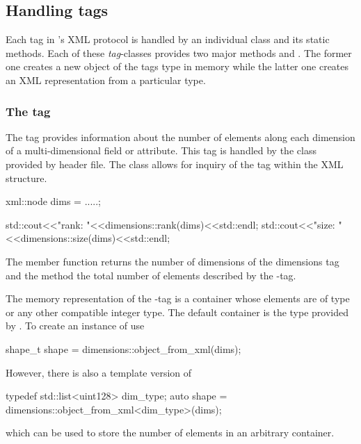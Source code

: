 \subsection{Handling tags}

Each tag in \libpniio's XML protocol is handled by an individual class and its
static methods. Each of these \emph{tag}-classes provides two major methods 
 and . The former one creates a new
object of the tags type in memory while the latter one creates an XML
representation from a particular type.

\subsubsection{The  tag}

The  tag provides information about the number of elements 
along each dimension of a multi-dimensional field or attribute. This tag is
handled by the  class provided by 
header file. 
The  class allows for inquiry of the  tag 
within the XML structure. 
\begin{cppcode}
xml::node dims = .....;

std::cout<<"rank: "<<dimensions::rank(dims)<<std::endl;
std::cout<<"size: "<<dimensions::size(dims)<<std::endl;
\end{cppcode}
The  member function returns the number of dimensions of the 
dimensions tag and the  method the total number of elements 
described by the -tag.

The memory representation of the -tag is a container 
whose elements are of type  or any other compatible integer type. 
The default container is the  type provided by \libpnicore. 
To create an instance of  use
\begin{cppcode}
shape_t shape = dimensions::object_from_xml(dims);
\end{cppcode}
However, there is also a template version of  
\begin{cppcode}
typedef std::list<uint128> dim_type;
auto shape = dimensions::object_from_xml<dim_type>(dims);
\end{cppcode}
which can be used to store the number of elements in an arbitrary container.

